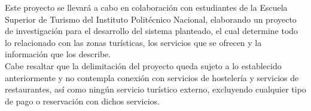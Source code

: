 Este proyecto se llevará a cabo en colaboración con estudiantes de la Escuela Superior de Turismo del Instituto Politécnico Nacional, elaborando un proyecto de investigación para el desarrollo del sistema planteado, el cual determine todo lo relacionado con las zonas turísticas, los servicios que se ofrecen y la información que los describe. \\

Cabe resaltar que la delimitación del proyecto queda sujeto a lo establecido anteriormente y no contempla conexión con servicios de hostelería y servicios de restaurantes, así como ningún servicio turístico externo, excluyendo cualquier tipo de pago o reservación con dichos servicios. \\
